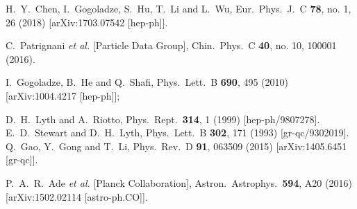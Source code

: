 \documentclass[aps,prd,preprint,superscriptaddress,showpacs,ctexart]{revtex4-1}
\begin{document}
\begin{thebibliography}{10}
 H.~Y.~Chen, I.~Gogoladze, S.~Hu, T.~Li
and L.~Wu, %
 Eur.\ Phys.\ J.\ C \textbf{78}, no. 1, 26 (2018) %
 {[}arXiv:1703.07542 {[}hep-ph{]}{]}. %


 C.~Patrignani \textit{et al.} {[}Particle
Data Group{]}, %
 Chin.\ Phys.\ C \textbf{40}, no. 10, 100001 (2016). %

 I.~Gogoladze, B.~He and Q.~Shafi, %
 Phys.\ Lett.\ B \textbf{690}, 495 (2010) %
 {[}arXiv:1004.4217 {[}hep-ph{]}{]};


 D.~H.~Lyth and A.~Riotto, %
Phys.\ Rept.\ \textbf{314}, 1 (1999) %
{[}hep-ph/9807278{]}. %
E.~D.~Stewart and D.~H.~Lyth, %
Phys.\ Lett.\ B \textbf{302}, 171 (1993) %
{[}gr-qc/9302019{]}. %
 Q.~Gao, Y.~Gong and T.~Li, %
Phys.\ Rev.\ D \textbf{91}, 063509 (2015) %
{[}arXiv:1405.6451 {[}gr-qc{]}{]}. %

 P.~A.~R.~Ade \textit{et al.} {[}Planck Collaboration{]},
 Astron.\ Astrophys.\ \textbf{594}, A20 (2016) %
 {[}arXiv:1502.02114 {[}astro-ph.CO{]}{]}. %


\end{thebibliography}
\end{document}
